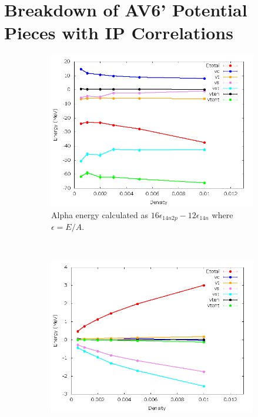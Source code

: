 \documentclass[12pt]{article}
\begin{document}
\section{Breakdown of AV6' Potential Pieces with IP Correlations}
\begin{figure}[h!]
   \centering
   \begin{subfigure}{0.49\textwidth}
      \includegraphics[width=\textwidth]{../av6_alpha_ip.png}
      \caption{Alpha energy calculated as $16\epsilon_{14n2p}-12\epsilon_{14n}$ where $\epsilon=E/A$.}
   \end{subfigure}
   ~
   \begin{subfigure}{0.49\textwidth}
      \includegraphics[width=\textwidth]{../av6_14n_ip.png}

\end{subfigure}
\end{figure}
\end{document}
